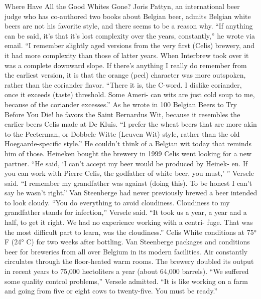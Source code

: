 \documentclass[a4paper,parskip=half]{scrartcl}
\begin{document}
Where Have All the Good Whites Gone?
Joris Pattyn, an international beer judge who has co-authored two books about Belgian
beer, admits Belgian white beers are not his favorite style, and there seems to be a
reason why.
“If anything can be said, it’s that it’s lost complexity over the years, constantly,” he wrote
via email. “I remember slightly aged versions from the very first (Celis) brewery, and it had
more complexity than those of latter years. When Interbrew took over it was a complete
downward slope. If there’s anything I really do remember from the earliest version, it is
that the orange (peel) character was more outspoken, rather than the coriander flavor.
“There it is, the C-word. I dislike coriander, once it exceeds (taste) threshold. Some Ameri-
can wits are just cold soup to me, because of the coriander excesses.”
As he wrote in 100 Belgian Beers to Try Before You Die! he favors the Saint Bernardus Wit,
because it resembles the earlier beers Celis made at De Kluis.
“I prefer the wheat beers that are more akin to the Peeterman, or Dobbele Witte (Leuven
Wit) style, rather than the old Hoegaarde-specific style.”
He couldn’t think of a Belgian wit today that reminds him of those.
Heineken bought the brewery in 1999 Celis went looking for a new
partner. “He said, ‘I can’t accept my beer would be produced by Heinek-
en. If you can work with Pierre Celis, the godfather of white beer, you
must,’ ” Versele said. “I remember my grandfather was against (doing
this). To be honest I can’t say he wasn’t right.”
Van Steenberge had never previously brewed a beer intended to
look cloudy. “You do everything to avoid cloudiness. Cloudiness to my
grandfather stands for infection,” Versele said. “It took us a year, a year
and a half, to get it right. We had no experience working with a centri-
fuge. That was the most difficult part to learn, was the cloudiness.”
Celis White conditions at 75° F (24° C) for two weeks after bottling.
Van Steenberge packages and conditions beer for breweries from all over
Belgium in its modern facilities. Air constantly circulates through the
floor-heated warm rooms. The brewery doubled its output in recent years
to 75,000 hectoliters a year (about 64,000 barrels). “We suffered some
quality control problems,” Versele admitted. “It is like working on a farm
and going from five or eight cows to twenty-five. You must be ready.”

\parencite[54]{Hieronymus2010}
\end{document}
